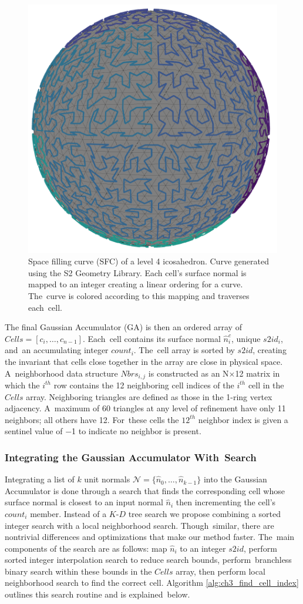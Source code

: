 \begin{figure}[H]
    \centering
    \includegraphics[width=.20\linewidth]{chapter_3_polylidar3d/imgs/fastga_ico_hilbert_v3.png}
    \caption[Space filling curve (SFC) of a level four refined icosahedron]{Space filling curve (SFC) of a level 4 icosahedron. Curve generated using the S2 Geometry Library. Each cell's surface normal is mapped to an integer creating a linear ordering for a curve. The~curve is colored according to this mapping and traverses each~cell.   }
    \label{fig:ch3_fastga_hilbert}
\end{figure}

The final Gaussian Accumulator (GA) is then an ordered array of $Cells = [ c_i, \ldots, c_{n-1}] $. Each~cell contains its surface normal $\hat{n}^{c}_{i}$, unique $s2id_i$, and~an accumulating integer $count_i$. The~cell array is sorted by $s2id$, creating the invariant that cells close together in the array are close in physical space. A~neighborhood data structure $Nbrs_{i,j}$ is constructed as an N$\times$12 matrix in which the $i^{th}$ row contains the 12 neighboring cell indices of the $i^{th}$ cell in the $Cells$ array. Neighboring triangles are defined as those in the 1-ring vertex adjacency. A~maximum of 60 triangles at any level of refinement have only 11 neighbors; all others have 12. For~these cells the $12^{th}$ neighbor index is given a sentinel value of $-$1 to indicate no neighbor is present. 

\subsubsection{Integrating the Gaussian Accumulator With~Search}\label{sec:ch3_methods_fastga_search}
Integrating a list of $k$ unit normals $\mathcal{N} = \{\hat{n}_0, \ldots, \hat{n}_{k-1} \}$ into the Gaussian Accumulator is done through a search that finds the corresponding cell whose surface normal is closest to an input normal $\hat{n}_i$ then incrementing the cell's $count_i$ member.
Instead of a $K$-$D$ tree search we propose combining a sorted integer search with a local neighborhood search. Though~similar, there are nontrivial differences and optimizations that make our method faster.  The~main components of the search are as follows: map $\hat{n}_i$ to an integer $s2id$, perform sorted integer interpolation search to reduce search bounds, perform~branchless binary search within these bounds in the $Cells$ array, then  perform local neighborhood search to find the correct cell. Algorithm \ref{alg:ch3_find_cell_index} outlines this search routine and is explained~below.

